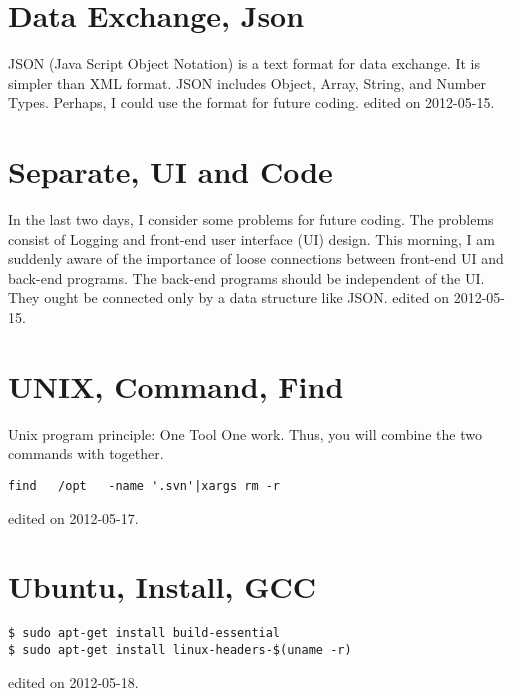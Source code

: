 \section{Data Exchange, Json}
JSON (Java Script Object Notation) is a text format for data exchange. 
It is simpler than XML format.
JSON includes Object, Array, String, and Number Types.
Perhaps, I could use the format for future coding.
\hfill {\tiny  edited on 2012-05-15.}
%
\section{Separate, UI and Code}
In the last two days, I consider some problems for future coding. 
The problems consist of Logging and front-end user interface (UI) design. 
This morning, I am suddenly aware of the importance of loose connections between front-end UI and back-end programs. 
The back-end programs should be independent of the UI. 
They ought be connected only by a data structure like JSON.
\hfill {\tiny  edited on 2012-05-15.}
%
\section{UNIX, Command, Find}
Unix program principle: One Tool One work. 
Thus, you will combine the two commands with together.
\begin{verbatim}
find   /opt   -name '.svn'|xargs rm -r
\end{verbatim}
\hfill {\tiny  edited on 2012-05-17.}
%
\section{Ubuntu, Install, GCC}
\begin{verbatim}
$ sudo apt-get install build-essential
$ sudo apt-get install linux-headers-$(uname -r)
\end{verbatim}
\hfill {\tiny  edited on 2012-05-18.}
%
